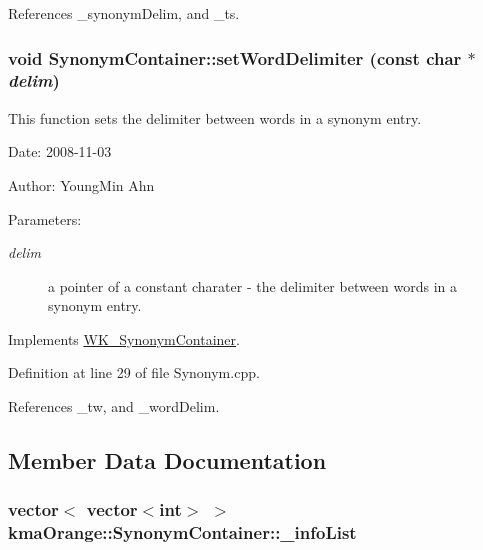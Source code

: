 References \_\-synonymDelim, and \_\-ts.\hypertarget{classkmaOrange_1_1SynonymContainer_7e23aea8d7bb9b468a870f7e31ff6893}{
\subsubsection[{setWordDelimiter}]{\setlength{\rightskip}{0pt plus 5cm}void SynonymContainer::setWordDelimiter (const char $\ast$ {\em delim})}}
\label{classkmaOrange_1_1SynonymContainer_7e23aea8d7bb9b468a870f7e31ff6893}


This function sets the delimiter between words in a synonym entry. 

\begin{Desc}
\item[Date:]2008-11-03 \end{Desc}
\begin{Desc}
\item[Author:]YoungMin Ahn \end{Desc}
\begin{Desc}
\item[Parameters:]
\begin{description}
\item[{\em delim}]a pointer of a constant charater - the delimiter between words in a synonym entry. \end{description}
\end{Desc}


Implements \hyperlink{classWK__SynonymContainer_83e7c34dd30aad2478a58f324dcbd594}{WK\_\-SynonymContainer}.

Definition at line 29 of file Synonym.cpp.

References \_\-tw, and \_\-wordDelim.

\subsection{Member Data Documentation}
\hypertarget{classkmaOrange_1_1SynonymContainer_005dd18f743edb6e29f6441658a9d059}{
\subsubsection[{\_\-infoList}]{\setlength{\rightskip}{0pt plus 5cm}vector$<$ vector$<$int$>$ $>$ {\bf kmaOrange::SynonymContainer::\_\-infoList}}}
\label{classkmaOrange_1_1SynonymContainer_005dd18f743edb6e29f6441658a9d059}


